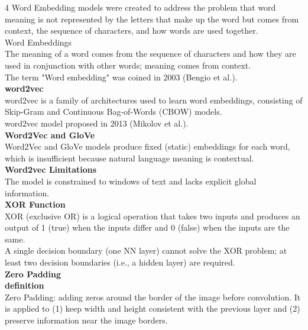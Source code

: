 \documentclass[8pt]{extarticle}
\begin{document}
\begin{multicols}{4}
Word Embedding models were created to address the problem that word meaning is not represented by the letters that make up the word but comes from context, the sequence of characters, and how words are used together.\\
Word Embeddings\\
The meaning of a word comes from the sequence of characters and how they are used in conjunction with other words; meaning comes from context.\\
The term "Word embedding" was coined in 2003 (Bengio et al.).\\
\vspace{2pt}\textbf{word2vec}\\
word2vec is a family of architectures used to learn word embeddings, consisting of Skip-Gram and Continuous Bag-of-Words (CBOW) models.\\
word2vec model proposed in 2013 (Mikolov et al.).\\
\vspace{2pt}\textbf{Word2Vec and GloVe}\\
Word2Vec and GloVe models produce fixed (static) embeddings for each word, which is insufficient because natural language meaning is contextual.\\
\vspace{2pt}\textbf{Word2vec Limitations}\\
The model is constrained to windows of text and lacks explicit global information.\\
\vspace{2pt}\textbf{XOR Function}\\
XOR (exclusive OR) is a logical operation that takes two inputs and produces an output of 1 (true) when the inputs differ and 0 (false) when the inputs are the same.\\
A single decision boundary (one NN layer) cannot solve the XOR problem; at least two decision boundaries (i.e., a hidden layer) are required.\\
\vspace{2pt}\textbf{Zero Padding}\\

\vspace{2pt}\textbf{definition}\\
Zero Padding: adding zeros around the border of the image before convolution. It is applied to (1) keep width and height consistent with the previous layer and (2) preserve information near the image borders.\\

\end{multicols}
\end{document}
